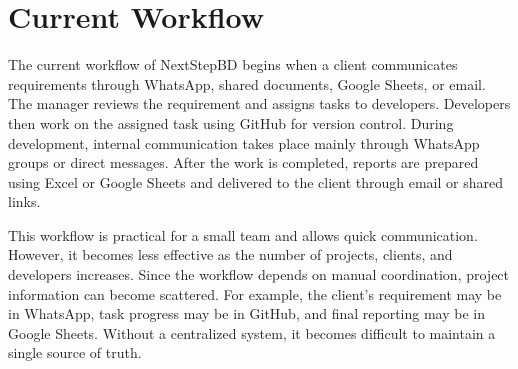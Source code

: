 \documentclass[12pt,a4paper]{report}
\begin{document}
\section{Current Workflow}

The current workflow of NextStepBD begins when a client communicates requirements through WhatsApp, shared documents, Google Sheets, or email. The manager reviews the requirement and assigns tasks to developers. Developers then work on the assigned task using GitHub for version control. During development, internal communication takes place mainly through WhatsApp groups or direct messages. After the work is completed, reports are prepared using Excel or Google Sheets and delivered to the client through email or shared links.

This workflow is practical for a small team and allows quick communication. However, it becomes less effective as the number of projects, clients, and developers increases. Since the workflow depends on manual coordination, project information can become scattered. For example, the client’s requirement may be in WhatsApp, task progress may be in GitHub, and final reporting may be in Google Sheets. Without a centralized system, it becomes difficult to maintain a single source of truth.
\end{document}
